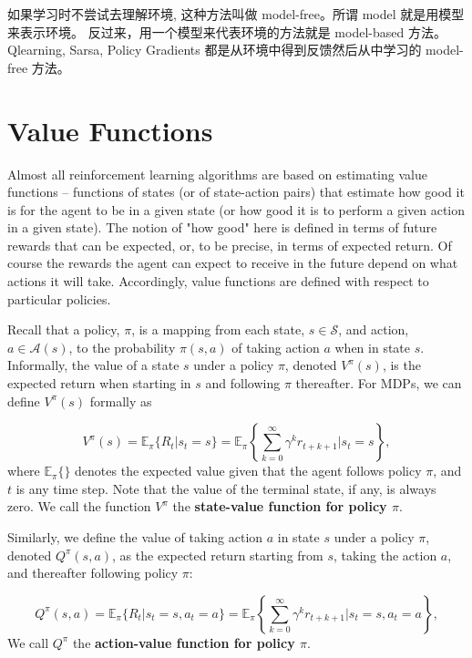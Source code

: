 如果学习时不尝试去理解环境, 这种方法叫做 model-free。所谓 model 就是用模型来表示环境。
反过来，用一个模型来代表环境的方法就是 model-based 方法。 Qlearning, Sarsa, 
Policy Gradients 都是从环境中得到反馈然后从中学习的 model-free 方法。


\section{Value Functions}

Almost all reinforcement learning algorithms are based on estimating value functions 
-- functions of states (or of state-action pairs) that estimate how good it is for 
the agent to be in a given state (or how good it is to perform a given action in a 
given state). The notion of "how good" here is defined in terms of future rewards 
that can be expected, or, to be precise, in terms of expected return. Of course the 
rewards the agent can expect to receive in the future depend on what actions it will 
take. Accordingly, value functions are defined with respect to particular policies.

Recall that a policy, $\pi$, is a mapping from each state, $s\in\mathcal{S}$, and 
action, $a\in\mathcal{A}(s)$, to the probability $\pi(s,a)$ of taking action $a$ 
when in state $s$. Informally, the value of a state $s$ under a policy $\pi$, denoted 
$V^\pi(s)$, is the expected return when starting in $s$ and following $\pi$ thereafter. 
For MDPs, we can define $V^\pi(s)$ formally as

\begin{equation}\label{rl-policy-state-value}
V^\pi(s) = \mathbb{E}_\pi\{R_t|s_t = s\} = 
\mathbb{E}_\pi\left\{ \sum_{k=0}^\infty\gamma^k r_{t+k+1} | s_t = s \right\},
\end{equation}
where $\mathbb{E}_\pi\{ \}$ denotes the expected value given that the agent follows 
policy $\pi$, and $t$ is any time step. Note that the value of the terminal state, if 
any, is always zero. We call the function $V^\pi$ the {\bf state-value function for 
policy $\pi$}.

Similarly, we define the value of taking action $a$ in state $s$ under a policy $\pi$, 
denoted $Q^\pi(s,a)$, as the expected return starting from $s$, taking the action $a$, 
and thereafter following policy $\pi$:

\begin{equation}\label{rl-policy-action-value}
Q^\pi(s, a) = \mathbb{E}_\pi\{R_t|s_t = s, a_t = a\} = 
\mathbb{E}_\pi\left\{ \sum_{k=0}^\infty\gamma^k r_{t+k+1} | s_t = s, a_t = a \right\},
\end{equation}
We call $Q^\pi$ the {\bf action-value function for policy $\pi$}.

